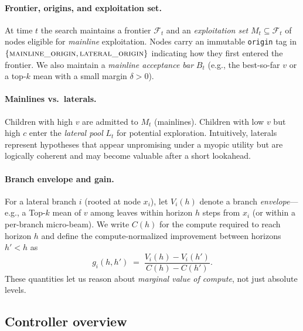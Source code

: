 \documentclass{article}
\begin{document}
\paragraph{Frontier, origins, and exploitation set.}
At time $t$ the search maintains a frontier $\mathcal{F}_t$ and an \emph{exploitation set} $M_t \subseteq \mathcal{F}_t$ of nodes eligible for \emph{mainline} exploitation.
Nodes carry an immutable \texttt{origin} tag in $\{\textsc{mainline\_origin},\textsc{lateral\_origin}\}$ indicating how they first entered the frontier.
We also maintain a \emph{mainline acceptance bar} $B_t$ (e.g., the best-so-far $v$ or a top-$k$ mean with a small margin $\delta>0$).

\paragraph{Mainlines vs.\ laterals.}
Children with high $v$ are admitted to $M_t$ (mainlines).
Children with low $v$ but high $c$ enter the \emph{lateral pool} $L_t$ for potential exploration.
Intuitively, laterals represent hypotheses that appear unpromising under a myopic utility but are logically coherent and may become valuable after a short lookahead.

\paragraph{Branch envelope and gain.}
For a lateral branch $i$ (rooted at node $x_i$), let $V_i(h)$ denote a branch \emph{envelope}—e.g., a Top-$k$ mean of $v$ among leaves within horizon $h$ steps from $x_i$ (or within a per-branch micro-beam). We write $C(h)$ for the compute required to reach horizon $h$ and define the compute-normalized improvement between horizons $h'<h$ as
\[
g_i(h,h') \;=\; \frac{V_i(h)-V_i(h')}{C(h)-C(h')}.
\]
These quantities let us reason about \emph{marginal value of compute}, not just absolute levels.

\vspace{0.5em}
\subsection{Controller overview}
\label{sec:controller}
\end{document}
